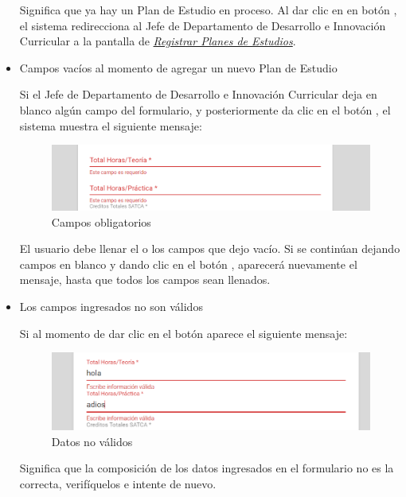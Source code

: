 \begin{itemize}
	
	Significa que ya hay un Plan de Estudio en proceso. Al dar clic en en botón , el sistema redirecciona al Jefe de Departamento de Desarrollo e Innovación Curricular a la pantalla de \hyperlink{registrarPE}{\textit{Registrar Planes de Estudios}}. 
	
	\item Campos vacíos al momento de agregar un nuevo Plan de Estudio
	
	Si el Jefe de Departamento de Desarrollo e Innovación Curricular deja en blanco algún campo del formulario, y posteriormente da clic en el botón , el sistema muestra el siguiente mensaje:
		\begin{figure}[!hbtp]
		\centering
		\hypertarget{ms4}{\includegraphics[width=0.7\linewidth]{images/SP4-GPE/m4}}
		\caption{Campos obligatorios}
		\label{ms4}
	    \end{figure}
    
	El usuario debe llenar el o los campos que dejo vacío. Si se continúan dejando campos en blanco y dando clic en el botón , aparecerá nuevamente el mensaje, hasta que todos los campos sean llenados.\\
	
	\newpage
	
	\item Los campos ingresados no son válidos
	
	Si al momento de dar clic en el botón  aparece el siguiente mensaje:
	\begin{figure}[!hbtp]
		\centering
		\hypertarget{ms5}{\includegraphics[width=0.7\linewidth]{images/SP4-GPE/m5}}
		\caption{Datos no válidos}
		\label{ms5}
	\end{figure}

	Significa que la composición de los datos ingresados en el formulario no es la correcta, verifíquelos e intente de nuevo.
	
\end{itemize}








